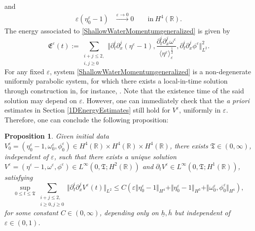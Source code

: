 \documentclass[reqno,11pt]{amsart}
\newcommand{\norm}[2]{\Vert #1 \Vert_{#2}}
\theoremstyle{plain}
\newtheorem{proposition}[theorem]{Proposition}
\theoremstyle{definition}
\numberwithin{equation}{section}
\begin{document}
and 
\begin{align}
    \label{Vsc_initial-2}
    \varepsilon (\eta_0^\varepsilon-1) & \xrightarrow{\varepsilon\to 0} 0  \qquad   \text{in} ~ H^4(\mathbb R). 
\end{align}
The energy associated to \eqref{ShallowWaterMomentumgeneralized} is given by
\begin{equation}
    \label{EpsilonEnergy}
    \mathfrak E^{\varepsilon}(t):=\sum_{\substack{i+j\leq 2,\\ i,j \geq 0}} \Vert\partial_t^i\partial_x^j (\eta^{\varepsilon}-1),\frac{\partial_t^i\partial_x^j \omega^{\varepsilon}}{{\langle \eta^{\varepsilon}\rangle}^{\frac{1}{2}}_{\varepsilon}},\partial_t^i\partial_x^{j}\phi^{\varepsilon}\Vert_{L^2}^2.
\end{equation}
For any fixed $ \varepsilon $, system \eqref{ShallowWaterMomentumgeneralized} is a non-degenerate uniformly parabolic system, for which there exists a local-in-time solution through construction in, for instance, \cite{Taylor}. Note that the existence time of the said solution may depend on $ \varepsilon $. However, one can immediately check that the {\it a priori} estimates in Section \ref{1DEnergyEstimates} still hold for $ V^\varepsilon $, uniformly in $ \varepsilon $. Therefore, one can conclude the following proposition:
\begin{proposition}
    \label{WellPosedViscousProblem}
    Given initial data $ V^\varepsilon_0 = (\eta_0^{\varepsilon}-1,\omega_0^{\varepsilon}, \phi_0^{\varepsilon})\in H^4(\mathbb{R})\times H^4(\mathbb{R})\times H^4(\mathbb{R})$, 
    there exists $ \mathfrak{T}\in (0,\infty) $, independent of $ \varepsilon $, such that there exists a unique solution $ V^\varepsilon = (\eta^\varepsilon-1,\omega^\varepsilon,\phi^\varepsilon) \in  L^\infty(0,\mathfrak{T};H^2(\mathbb{R})) $ and $ \partial_t V^\varepsilon \in L^\infty(0,\mathfrak{T};H^1(\mathbb R)) $, satisfying
    \begin{equation}
        \label{energy-viscous}
        \sup_{0\leq t \leq \mathfrak{T}} \sum_{\substack{i + j \leq 2, \\
        i \geq 0, j \geq 0}} \norm{\partial_t^i\partial_x^j V^\varepsilon(t)}{L^2} \leq C (\varepsilon\norm{ \eta^\varepsilon_0-1}{H^4}+\norm{\eta_0^\varepsilon-1}{H^3} + \norm{\omega^\varepsilon_0,\phi^\varepsilon_0}{H^{4}} ),
    \end{equation}
    for some constant $ C \in (0,\infty) $, depending only on $ \underline h, \overline h $ but independent of $ \varepsilon \in (0,1) $. 
\end{proposition}
\end{document}
